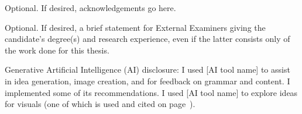 \documentclass[times,12pt,thesis,online]{uom_thesis_casson} %
\begin{document}
\begin{uomoriginality} %
  \uomoriginalitydeclaration 
\end{uomoriginality}



\uomcopyrightstatement %



\begin{uomacknowledgements} %
Optional. If desired, acknowledgements go here.
\end{uomacknowledgements}



\begin{uomauthor} %
Optional. If desired, a brief statement for External Examiners giving the candidate’s degree(s) and research experience, even if the latter consists only of the work done for this thesis.
\end{uomauthor} 



\begin{uomai} %
Generative Artificial Intelligence (AI) disclosure: I used [AI tool name] to assist in idea generation, image creation, and for feedback on grammar and content. I implemented some of its recommendations. I used [AI tool name] to explore ideas for visuals (one of which is used and cited on page~\pageref{sec:content}). %
\end{uomai}
\end{document}
